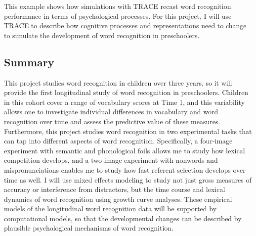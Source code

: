 \documentclass[]{book}
\theoremstyle{definition}
\theoremstyle{definition}
\theoremstyle{remark}
\begin{document}
This example shows how simulations with TRACE recast word recognition
performance in terms of psychological processes. For this project, I
will use TRACE to describe how cognitive processes and representations
need to change to simulate the development of word recognition in
preschoolers.

\subsection{Summary}\label{summary-1}

This project studies word recognition in children over three years, so
it will provide the first longitudinal study of word recognition in
preschoolers. Children in this cohort cover a range of vocabulary scores
at Time 1, and this variability allows one to investigate individual
differences in vocabulary and word recognition over time and assess the
predictive value of these measures. Furthermore, this project studies
word recognition in two experimental tasks that can tap into different
aspects of word recognition. Specifically, a four-image experiment with
semantic and phonological foils allows me to study how lexical
competition develops, and a two-image experiment with nonwords and
mispronunciations enables me to study how fast referent selection
develops over time as well. I will use mixed effects modeling to study
not just gross measures of accuracy or interference from distractors,
but the time course and lexical dynamics of word recognition using
growth curve analyses. These empirical models of the longitudinal word
recognition data will be supported by computational models, so that the
developmental changes can be described by plausible psychological
mechanisms of word recognition.

\appendix



\end{document}
